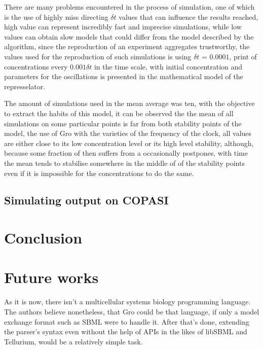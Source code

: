 \documentclass[12pt]{article}
\begin{document}
There are many problems encountered in the process of simulation, one of which is the use of highly miss directing $\delta{t}$ values that can influence the results reached, high value can represent incredibly fast and imprecise simulations, while low values can obtain slow models that could differ from the model described by the algorithm, since the reproduction of an experiment aggregates trustworthy, the values used for the reproduction of such simulations is using $\delta{t}$ = $0.0001$, print of concentrations every $0.001\delta{t}$ in the time scale, with initial concentration and parameters for the oscillations is presented in the mathematical model of the represselator.

The amount of simulations used in the mean average was ten, with the objective to extract the habits of this model, it can be observed the the mean of all simulations on some particular points is far from both stability points of the model, the use of Gro with the varieties of the frequency of the clock, all values are either close to its low concentration level or its high level stability, although, because some fraction of then suffers from a occasionally postpones, with time the mean tends to stabilise somewhere in the middle of of the stability points even if it is impossible for the concentrations to do the same.

\subsection{Simulating output on COPASI}
    \lipsum[1]

\section{Conclusion}
    \lipsum[1]
    
\section{Future works}
    As it is now, there isn't a multicellular systems biology programming language. The authors believe nonetheless, that Gro could be that language, if only a model exchange format such as SBML were to handle it. After that's done, extending the parser's syntax even without the help of APIs in the likes of libSBML and Tellurium, would be a relatively simple task.



\end{document}
